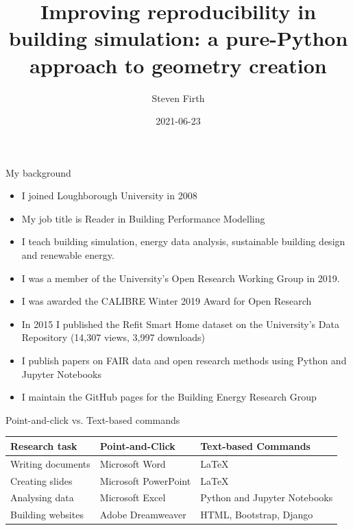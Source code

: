 \documentclass{beamer}
\title[Improving reproducibility in building simulation]{Improving reproducibility in building simulation: a pure-Python approach to geometry creation}
\author{Steven Firth}
\institute{Loughborough University}
\date{2021-06-23}
\begin{document}
	
	\begin{frame}
		\maketitle
	\end{frame}
	
	\begin{frame}{My background}
		\begin{itemize}
			\item I joined Loughborough University in 2008
			\item My job title is Reader in Building Performance Modelling
			\item I teach building simulation, energy data analysis, sustainable building design and renewable energy.
			\item I was a member of the University's Open Research Working Group in 2019.
			\item I was awarded the CALIBRE Winter 2019 Award for Open Research
			\item In 2015 I published the Refit Smart Home dataset on the University's Data Repository (14,307 views, 3,997 downloads)
			\item I publish papers on FAIR data and open research methods using Python and Jupyter Notebooks 
			\item I maintain the GitHub pages for the Building Energy Research Group
			
		\end{itemize}
	\end{frame}

	\begin{frame}{Point-and-click vs. Text-based commands}
		\hyphenpenalty=100000
		\begin{tabular}{p{}p{}p{0.3\textwidth}}
			\toprule
			Research task & Point-and-Click & Text-based Commands \\
			\midrule
			Writing documents & Microsoft Word & \LaTeX \\
			Creating slides & Microsoft PowerPoint & \LaTeX \\
			Analysing data & Microsoft Excel & Python and Jupyter Notebooks \\
			Building websites & Adobe Dreamweaver & HTML, Bootstrap, Django
		\end{tabular}
	\end{frame}
\end{document}
